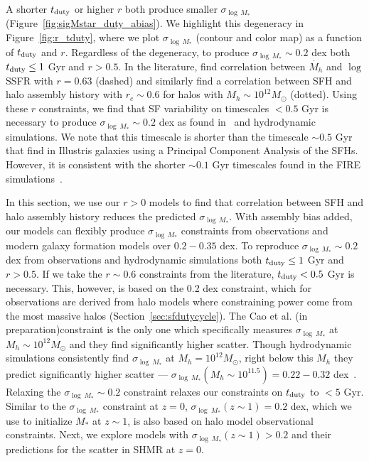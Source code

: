 \documentclass[12pt, letterpaper, preprint, tighten]{aastex62}
\newcommand{\edt}[1]{{\color{dred}{\bf} #1}}
\newcommand{\cao}{Cao et al. (in preparation)}
\newcommand{\tduty}{t_{\rm duty}}
\begin{document}
A shorter $t_{\rm duty}$ or higher $r$ both produce smaller $\sigma_{\log\,M_*}$
(Figure~\ref{fig:sigMstar_duty_abias}). We highlight this degeneracy in
Figure~\ref{fig:r_tduty}, where we plot $\sigma_{\log\,M_*}$ (contour and
color map) as a function of $t_{\rm duty}$ and $r$. Regardless of the
degeneracy, to produce $\sigma_{\log\,M_*} \sim 0.2$ dex both $\tduty \leq 1$ Gyr
and $r > 0.5$. In the literature, \cite{tinker2018b} find correlation
between $\dot{M_h}$ and $\log$ SSFR with $r = 0.63$ (dashed) and
\cite{behroozi2018} similarly find a correlation between SFH and halo
assembly history with $r_c \sim 0.6$ for halos with $M_h \sim 10^{12}M_\odot$
(dotted). Using these $r$ constraints, we find that SF variability on
timescales $< 0.5$ Gyr is necessary to produce $\sigma_{\log\,M_*} \sim 0.2$ dex
as found in~\cite{more2011, leauthaud2012, reddick2013, tinker2013, zu2015}
and hydrodynamic simulations. We note that this timescale is shorter than
the timescale $\sim 0.5$ Gyr that \cite{sparre2015} find in Illustris galaxies
using a Principal Component Analysis of the SFHs. However, it is consistent with
the shorter $\sim 0.1$ Gyr timescales found in the FIRE simulations~\citep{hopkins2014, sparre2017}.

\edt{In this section, we use our $r > 0$ models to find that correlation between
SFH and halo assembly history reduces the predicted $\sigma_{\log\,M_*}$.
With assembly bias added, our models can flexibly produce $\sigma_{\log\,M_*}$
constraints from observations and modern galaxy formation models over
$0.2 - 0.35$ dex. To reproduce $\sigma_{\log\,M_*}\sim 0.2$ dex from observations
and hydrodynamic simulations both $t_{\rm duty} \leq 1$ Gyr and $r > 0.5$. If
we take the $r\sim0.6$ constraints from the literature, $t_{\rm duty} < 0.5$ Gyr
is necessary. This, however, is based on the 0.2 dex constraint, which
for observations are derived from halo models where constraining power
come from the most massive halos (Section~\ref{sec:sfdutycycle}). The
\cao constraint is the only one which specifically measures $\sigma_{\log~M_*}$
at $M_h \sim 10^{12}M_\odot$ and they find significantly higher scatter.
Though hydrodynamic simulations consistently find $\sigma_{\log~M_*}$ at
$M_h = 10^{12}M_\odot$, right below this $M_h$ they predict significantly
higher scatter --- $\sigma_{\log~M_*}(M_h\sim 10^{11.5}) = 0.22 - 0.32$
dex~\citep{wechsler2018}. Relaxing the $\sigma_{\log~M_*} \sim 0.2$ constraint
relaxes our constraints on $\tduty$ to $< 5$ Gyr. Similar to the $\sigma_{\log~M_*}$
constraint at $z=0$, $\sigma_{\log~M_*}(z\sim1) = 0.2$ dex, which we use to initialize
$M_*$ at $z\sim1$, is also based on halo model observational constraints.
Next, we explore models with $\sigma_{\log~M_*}(z\sim1) > 0.2$ and their
predictions for the scatter in SHMR at $z=0$.
}
\end{document}
